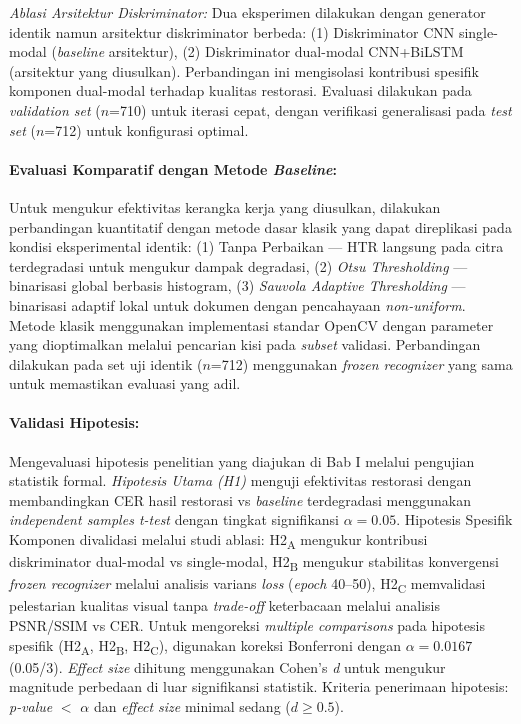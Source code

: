 \documentclass[12pt,a4paper]{article}
\begin{document}
\textit{Ablasi Arsitektur Diskriminator:} Dua eksperimen dilakukan dengan generator identik namun arsitektur diskriminator berbeda: (1) Diskriminator CNN single-modal (\textit{baseline} arsitektur), (2) Diskriminator dual-modal CNN+BiLSTM (arsitektur yang diusulkan). Perbandingan ini mengisolasi kontribusi spesifik komponen dual-modal terhadap kualitas restorasi. Evaluasi dilakukan pada \textit{validation set} ($n$=710) untuk iterasi cepat, dengan verifikasi generalisasi pada \textit{test set} ($n$=712) untuk konfigurasi optimal.

\paragraph{Evaluasi Komparatif dengan Metode \textit{Baseline}:}
Untuk mengukur efektivitas kerangka kerja yang diusulkan, dilakukan perbandingan kuantitatif dengan metode dasar klasik yang dapat direplikasi pada kondisi eksperimental identik: (1) Tanpa Perbaikan — HTR langsung pada citra terdegradasi untuk mengukur dampak degradasi, (2) \textit{Otsu Thresholding} — binarisasi global berbasis histogram, (3) \textit{Sauvola Adaptive Thresholding} — binarisasi adaptif lokal untuk dokumen dengan pencahayaan \textit{non-uniform}. Metode klasik menggunakan implementasi standar OpenCV dengan parameter yang dioptimalkan melalui pencarian kisi pada \textit{subset} validasi. Perbandingan dilakukan pada set uji identik ($n$=712) menggunakan \textit{frozen recognizer} yang sama untuk memastikan evaluasi yang adil.

\paragraph{Validasi Hipotesis:}
Mengevaluasi hipotesis penelitian yang diajukan di Bab I melalui pengujian statistik formal. \textit{Hipotesis Utama (H1)} menguji efektivitas restorasi dengan membandingkan CER hasil restorasi vs \textit{baseline} terdegradasi menggunakan \textit{independent samples t-test} dengan tingkat signifikansi $\alpha = 0.05$. Hipotesis Spesifik Komponen divalidasi melalui studi ablasi: H2\textsubscript{A} mengukur kontribusi diskriminator dual-modal vs single-modal, H2\textsubscript{B} mengukur stabilitas konvergensi \textit{frozen recognizer} melalui analisis varians \textit{loss} (\textit{epoch} 40--50), H2\textsubscript{C} memvalidasi pelestarian kualitas visual tanpa \textit{trade-off} keterbacaan melalui analisis PSNR/SSIM vs CER. Untuk mengoreksi \textit{multiple comparisons} pada hipotesis spesifik (H2\textsubscript{A}, H2\textsubscript{B}, H2\textsubscript{C}), digunakan koreksi Bonferroni dengan $\alpha = 0.0167$ (0.05/3). \textit{Effect size} dihitung menggunakan Cohen's \textit{d} untuk mengukur magnitude perbedaan di luar signifikansi statistik. Kriteria penerimaan hipotesis: \textit{p-value} $<$ $\alpha$ dan \textit{effect size} minimal sedang ($d \geq 0.5$).
\end{document}
